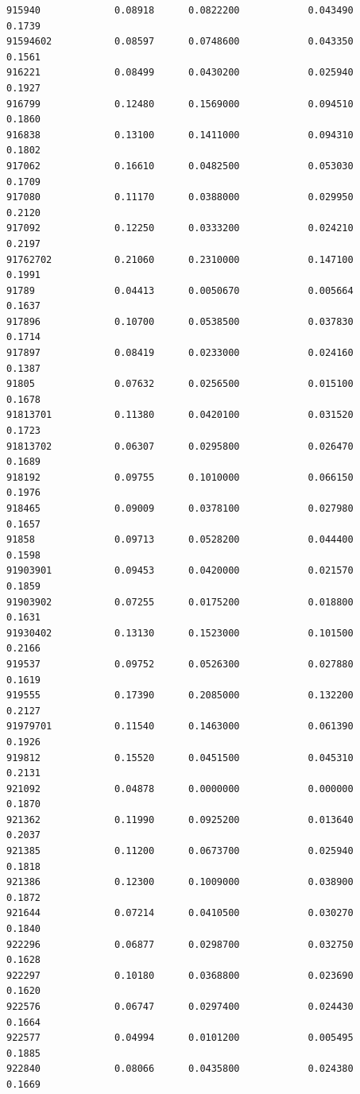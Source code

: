 \documentclass[
  letterpaper,
  DIV=11,
  numbers=noendperiod]{scrartcl}
\begin{document}
\begin{verbatim}
915940             0.08918      0.0822200            0.043490        0.1739
91594602           0.08597      0.0748600            0.043350        0.1561
916221             0.08499      0.0430200            0.025940        0.1927
916799             0.12480      0.1569000            0.094510        0.1860
916838             0.13100      0.1411000            0.094310        0.1802
917062             0.16610      0.0482500            0.053030        0.1709
917080             0.11170      0.0388000            0.029950        0.2120
917092             0.12250      0.0333200            0.024210        0.2197
91762702           0.21060      0.2310000            0.147100        0.1991
91789              0.04413      0.0050670            0.005664        0.1637
917896             0.10700      0.0538500            0.037830        0.1714
917897             0.08419      0.0233000            0.024160        0.1387
91805              0.07632      0.0256500            0.015100        0.1678
91813701           0.11380      0.0420100            0.031520        0.1723
91813702           0.06307      0.0295800            0.026470        0.1689
918192             0.09755      0.1010000            0.066150        0.1976
918465             0.09009      0.0378100            0.027980        0.1657
91858              0.09713      0.0528200            0.044400        0.1598
91903901           0.09453      0.0420000            0.021570        0.1859
91903902           0.07255      0.0175200            0.018800        0.1631
91930402           0.13130      0.1523000            0.101500        0.2166
919537             0.09752      0.0526300            0.027880        0.1619
919555             0.17390      0.2085000            0.132200        0.2127
91979701           0.11540      0.1463000            0.061390        0.1926
919812             0.15520      0.0451500            0.045310        0.2131
921092             0.04878      0.0000000            0.000000        0.1870
921362             0.11990      0.0925200            0.013640        0.2037
921385             0.11200      0.0673700            0.025940        0.1818
921386             0.12300      0.1009000            0.038900        0.1872
921644             0.07214      0.0410500            0.030270        0.1840
922296             0.06877      0.0298700            0.032750        0.1628
922297             0.10180      0.0368800            0.023690        0.1620
922576             0.06747      0.0297400            0.024430        0.1664
922577             0.04994      0.0101200            0.005495        0.1885
922840             0.08066      0.0435800            0.024380        0.1669

\end{verbatim}
\end{document}
